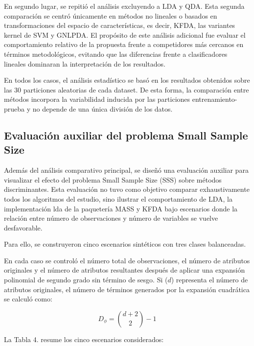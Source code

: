 En segundo lugar, se repitió el análisis excluyendo a LDA y QDA. Esta segunda comparación se centró únicamente en métodos no lineales o basados en transformaciones del espacio de características, es decir, KFDA, las variantes kernel de SVM y GNLPDA. El propósito de este análisis adicional fue evaluar el comportamiento relativo de la propuesta frente a competidores más cercanos en términos metodológicos, evitando que las diferencias frente a clasificadores lineales dominaran la interpretación de los resultados.

En todos los casos, el análisis estadístico se basó en los resultados obtenidos sobre las 30 particiones aleatorias de cada dataset. De esta forma, la comparación entre métodos incorpora la variabilidad inducida por las particiones entrenamiento-prueba y no depende de una única división de los datos.

\subsection{Evaluación auxiliar del problema Small Sample Size}

Además del análisis comparativo principal, se diseñó una evaluación auxiliar para visualizar el efecto del problema Small Sample Size (SSS) sobre métodos discriminantes. Esta evaluación no tuvo como objetivo comparar exhaustivamente todos los algoritmos del estudio, sino ilustrar el comportamiento de LDA, la implementación lda de la paquetería MASS y KFDA bajo escenarios donde la relación entre número de observaciones y número de variables se vuelve desfavorable.

Para ello, se construyeron cinco escenarios sintéticos con tres clases balanceadas. 

En cada caso se controló el número total de observaciones, el número de atributos originales y el número de atributos resultantes después de aplicar una expansión polinomial de segundo grado sin término de sesgo. Si ($d$) representa el número de atributos originales, el número de términos generados por la expansión cuadrática se calculó como:

\begin{equation}
	D_\phi = \binom{d+2}{2}-1
	\label{eq:EM21}
\end{equation}

La Tabla 4. resume los cinco escenarios considerados:

